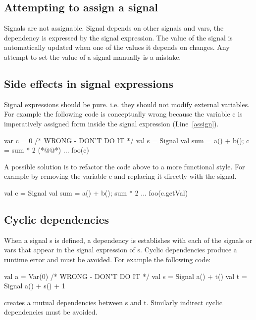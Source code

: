 \documentclass[10pt,a4paper]{article}
\newcommand{\code}[1]{{\fontfamily{cmtt}\small\selectfont#1}}
\begin{document}
\subsection{Attempting to assign a signal} Signals are not
assignable. Signal depends on other signals and vars, the dependency
is expressed by the signal expression. The value of the signal is
automatically updated when one of the values it depends on
changes. Any attempt to set the value of a signal manually is a
mistake.


\subsection{Side effects in signal expressions} Signal expressions
should be pure. i.e. they should not modify external variables. For
example the following code is conceptually wrong because the variable
\code{c} is imperatively assigned form inside the signal expression
(Line~\ref{assign}).
\begin{codenv}
var c = 0                 /* WRONG - DON'T DO IT */
val s = Signal{ 
  val sum = a() + b(); 
  c = sum * 2  (*@\label{assign}@*)
}
 ...
foo(c)
\end{codenv}

A possible solution is to refactor the code above to a more functional
style. For example by removing the variable \code{c} and replacing it
directly with the signal.
\begin{codenv}
val c = Signal{ 
  val sum = a() + b(); 
  sum * 2  
}
 ...
foo(c.getVal)
\end{codenv}



\subsection{Cyclic dependencies} When a signal \code{s} is defined, a
dependency is establishes with each of the signals or vars that appear
in the signal expression of \code{s}. Cyclic dependencies produce a
runtime error and must be avoided. For example the following code:

\begin{codenv}
val a = Var(0)             /* WRONG - DON'T DO IT */
val s = Signal{ a() + t() }
val t = Signal{ a() + s() + 1 }
\end{codenv}

creates a mutual dependencies between \code{s} and \code{t}. Similarly
indirect cyclic dependencies must be avoided.
\end{document}

